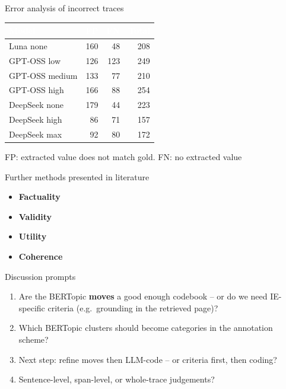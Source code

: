 \documentclass[aspectratio=169, 10pt]{beamer}
\newcommand{\hcell}[1]{\textcolor{white}{\textbf{#1}}}  %
\begin{document}

\begin{frame}{Error analysis of incorrect traces}
\centering
\renewcommand{\arraystretch}{1.25}
\small
\begin{tabular}{l rr!{\color{lmudark}\vrule width 1.2pt}r}
\toprule
{}
\hcell{Model} & \hcell{FP} & \hcell{FN} & \hcell{Total}\\
\midrule
Luna none      & 160 & 48 & 208 \\
GPT-OSS low    & 126 & 123 & 249  \\
GPT-OSS medium & 133 &  77 & 210\\
GPT-OSS high   & 166 &  88 & 254 \\
DeepSeek none  & 179 &  44 & 223 \\
DeepSeek high  &  86 &  71 & 157  \\
DeepSeek max   &  92 &  80 & 172\\
\bottomrule
\end{tabular}

\vspace{0.6em}
{\footnotesize FP: extracted value does not match gold. FN: no extracted value}

\end{frame}


\begin{frame}{Further methods presented in literature}
\begin{itemize}
    \item \textbf{Factuality}
    \item \textbf{Validity}
    \item \textbf{Utility}
    \item \textbf{Coherence}
\end{itemize}
    
\end{frame}

\begin{frame}{Discussion prompts}
\begin{enumerate}
  \item Are the BERTopic \textbf{moves} a good enough codebook -- or do we need
        IE-specific criteria (e.g.\ grounding in the retrieved page)?
  \item Which BERTopic clusters should become categories in the annotation scheme?
  \item Next step: refine moves then LLM-code -- or criteria first, then coding?
  \item Sentence-level, span-level, or whole-trace judgements?
\end{enumerate}
\end{frame}
\end{document}
